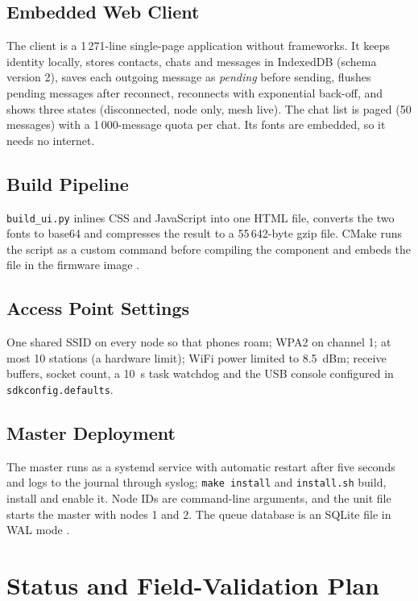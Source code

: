 \documentclass{tietreport}
\begin{document}
\section{Embedded Web Client}

The client is a 1\,271-line single-page application without
frameworks. It keeps identity locally, stores contacts, chats and
messages in IndexedDB (schema version 2), saves each outgoing message
as \emph{pending} before sending, flushes pending messages after
reconnect, reconnects with exponential back-off, and shows three
states (disconnected, node only, mesh live). The chat list is paged
(50 messages) with a 1\,000-message quota per chat. Its fonts are
embedded, so it needs no internet.

\section{Build Pipeline}

\texttt{build\_ui.py} inlines CSS and JavaScript into one HTML file,
converts the two fonts to base64 and compresses the result to a
55\,642-byte gzip file. CMake runs the script as a custom command
before compiling the component and embeds the file in the firmware
image \cite{espidf}.

\section{Access Point Settings}

One shared SSID on every node so that phones roam; WPA2 on channel 1;
at most 10 stations (a hardware limit); WiFi power limited to 8.5~dBm;
receive buffers, socket count, a 10~s task watchdog and the USB
console configured in \texttt{sdkconfig.defaults}.

\section{Master Deployment}

The master runs as a systemd service with automatic restart after five
seconds and logs to the journal through syslog; \texttt{make install}
and \texttt{install.sh} build, install and enable it. Node IDs are
command-line arguments, and the unit file starts the master with nodes
1 and 2. The queue database is an SQLite file in WAL mode
\cite{sqlitewal}.

\chapter{Status and Field-Validation Plan}
\end{document}

